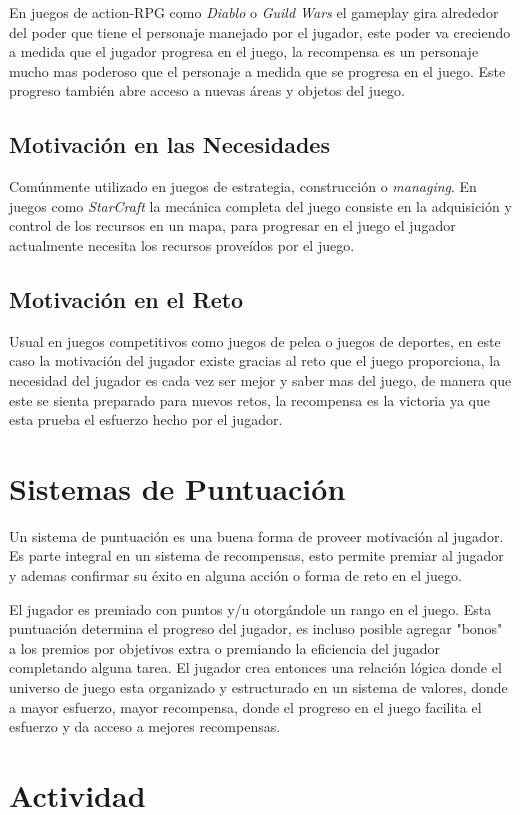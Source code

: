 En juegos de action-RPG como \emph{Diablo} \cite{diablo} o \emph{Guild Wars} \cite{guildwars} el gameplay gira alrededor del poder que tiene el personaje manejado por el jugador, este poder va creciendo a medida que el jugador progresa en el juego, la recompensa es un personaje mucho mas poderoso que el personaje a medida que se progresa en el juego. Este progreso también abre acceso a nuevas áreas y objetos del juego.
\subsection{Motivación en las Necesidades}
Comúnmente utilizado en juegos de estrategia, construcción o \emph{managing}. En juegos como \emph{StarCraft} \cite{starcraft} la mecánica completa del juego consiste en la adquisición y control de los recursos en un mapa, para progresar en el juego el jugador actualmente necesita los recursos proveídos por el juego.
\subsection{Motivación en el Reto}
Usual en juegos competitivos como juegos de pelea o juegos de deportes, en este caso la motivación del jugador existe gracias al reto que el juego proporciona, la necesidad del jugador es cada vez ser mejor y saber mas del juego, de manera que este se sienta preparado para nuevos retos, la recompensa es la victoria ya que esta prueba el esfuerzo hecho por el jugador.
\section{Sistemas de Puntuación}
Un sistema de puntuación es una buena forma de proveer motivación al jugador.  Es parte integral en un sistema de recompensas, esto permite premiar al jugador y ademas confirmar su éxito en alguna acción o forma de reto en el juego.

El jugador es premiado con puntos y/u otorgándole un rango en el juego. Esta puntuación determina el progreso del jugador, es incluso posible agregar "bonos" a los premios por objetivos extra o premiando la eficiencia del jugador completando alguna tarea. El jugador crea entonces una relación lógica donde el universo de juego esta organizado y estructurado en un sistema de valores, donde a mayor esfuerzo, mayor recompensa, donde el progreso en el juego facilita el esfuerzo y da acceso a mejores recompensas.
\section{Actividad}
